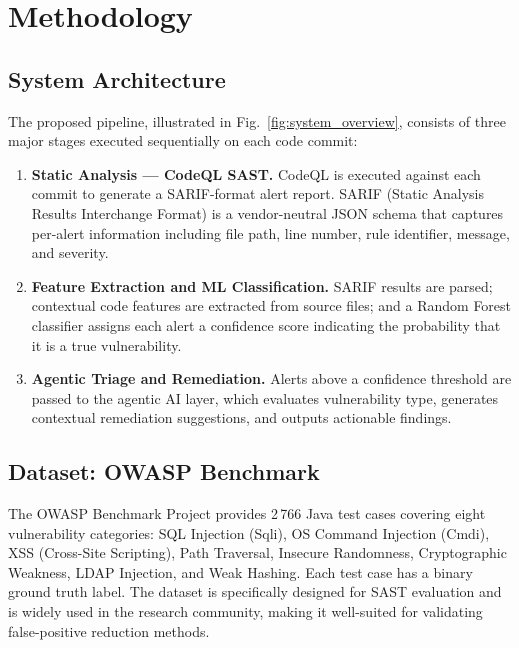 \documentclass[conference]{IEEEtran}
\begin{document}
\section{Methodology}
\label{sec:methodology}

\subsection{System Architecture}

The proposed pipeline, illustrated in Fig.~\ref{fig:system_overview}, consists
of three major stages executed sequentially on each code commit:

\begin{enumerate}[leftmargin=*, label=\textbf{Stage \arabic*:}, itemsep=4pt]
  \item \textbf{Static Analysis --- CodeQL SAST.} CodeQL is executed against each
        commit to generate a SARIF-format alert report. SARIF (Static Analysis
        Results Interchange Format) is a vendor-neutral JSON schema that captures
        per-alert information including file path, line number, rule identifier,
        message, and severity.
  \item \textbf{Feature Extraction and ML Classification.} SARIF results are
        parsed; contextual code features are extracted from source files;
        and a Random Forest classifier assigns each alert a confidence score
        indicating the probability that it is a true vulnerability.
  \item \textbf{Agentic Triage and Remediation.} Alerts above a confidence
        threshold are passed to the agentic AI layer, which evaluates vulnerability
        type, generates contextual remediation suggestions, and outputs actionable
        findings.
\end{enumerate}

\subsection{Dataset: OWASP Benchmark}

The OWASP Benchmark Project provides 2\,766 Java test cases covering eight
vulnerability categories: SQL Injection (Sqli), OS Command Injection (Cmdi),
XSS (Cross-Site Scripting), Path Traversal, Insecure Randomness, Cryptographic
Weakness, LDAP Injection, and Weak Hashing. Each test case has a binary ground
truth label. The dataset is specifically designed for SAST evaluation and is
widely used in the research community, making it well-suited for validating
false-positive reduction methods.
\end{document}

